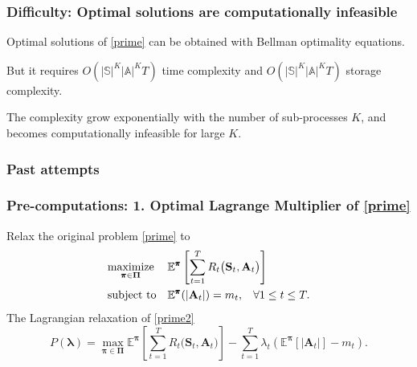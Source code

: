 \documentclass{beamer}
\newcommand{\lambdav}{\pmb{\lambda}}
\newcommand{\allp}{\pmb{\pi}}
\newcommand{\allpset}{\mathbf{\Pi}}
\newcommand{\allstater}{\mathbf{S}}
\newcommand{\allar}{\mathbf{A}}
\newcommand{\allr}{R}
\newcommand{\substates}{\mathbb{S}}
\newcommand{\subactions}{\mathbb{A}}
\begin{document}
\begin{frame}
\frametitle{Difficulty: Optimal solutions are computationally infeasible}
Optimal solutions of \eqref{prime} can be obtained with Bellman optimality equations.

\vspace{0.5cm}
But it requires $O(|\substates|^K|\subactions|^KT)$ time complexity and $O(|\substates|^K|\subactions|^KT)$ storage complexity.

\vspace{0.5cm}
The complexity grow exponentially with the number of sub-processes $K$, and becomes computationally infeasible for large $K$.
\end{frame}

\begin{frame}
\frametitle{Past attempts}
\end{frame}

\begin{frame}
\frametitle{Pre-computations: 1. Optimal Lagrange Multiplier of \eqref{prime}}
Relax the original problem \eqref{prime} to
\begin{equation}\label{prime2}
\begin{aligned}
& \underset{\allp\in\allpset}{\text{maximize}}
& & \mathbb{E}^{\allp}\left[\sum_{t=1}^{T}\allr_t\big(\allstater_t,\allar_t\big)\right] \\
& \text{subject to}
& & \mathbb{E}^{\allp}(|\allar_t|)=m_t, \hspace{3mm}\forall 1\leq t\leq T .
\end{aligned}
\end{equation}
The Lagrangian relaxation of \eqref{prime2}
\begin{equation}\label{ub}
 P(\lambdav)=\max_{\allp\in \allpset}\mathbb{E}^{\allp}\left[\sum_{t=1}^{T}\allr_t\big(\allstater_t,\allar_t\big)\right]-\sum_{t=1}^T\lambda_t\left(\mathbb{E}^{\allp}[|\allar_t|]-m_t\right).
 \end{equation} 
\end{frame}
\end{document}
